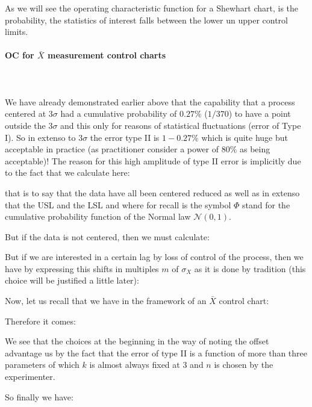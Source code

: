 	As we will see the operating characteristic function for a Shewhart chart, is the probability, the statistics of interest falls between the lower un upper control limits.

	\paragraph{OC for $\bar{X}$ measurement control charts}\mbox{}\\\\
	We have already demonstrated earlier above that the capability that a process centered at $3\sigma$ had a cumulative probability of $0.27\%$ ($1/370$) to have a point outside the $3\sigma$ and this only for reasons of statistical fluctuations (error of Type I). So in extenso to $3\sigma$ the error type II is $1-0.27\%$ which is quite huge but acceptable in practice (as practitioner consider a power of $80\%$ as being acceptable)! The reason for this high amplitude of type II error is implicitly due to the fact that we calculate here:
	
 	that is to say that the data have all been centered reduced as well as in extenso that the USL and the LSL and where for recall is the symbol $\Phi$ stand for the cumulative probability function of the Normal law $\mathcal{N}(0,1)$.

	But if the data is not centered, then we must calculate:
	
 	But if we are interested in a certain lag by loss of control of the process, then we have by expressing this shifts in multiples $m$ of $\sigma_X$ as it is done by tradition (this choice will be justified a little later):
	
 	Now, let us recall that we have in the framework of an $\bar{X}$ control chart:
	
	Therefore it comes:
	
 	We see that the choices at the beginning in the way of noting the offset advantage us by the fact that the error of type II is a function of more than three parameters of which $k$ is almost always fixed at $3$ and $n$ is chosen by the experimenter.

	So finally we have:
	
